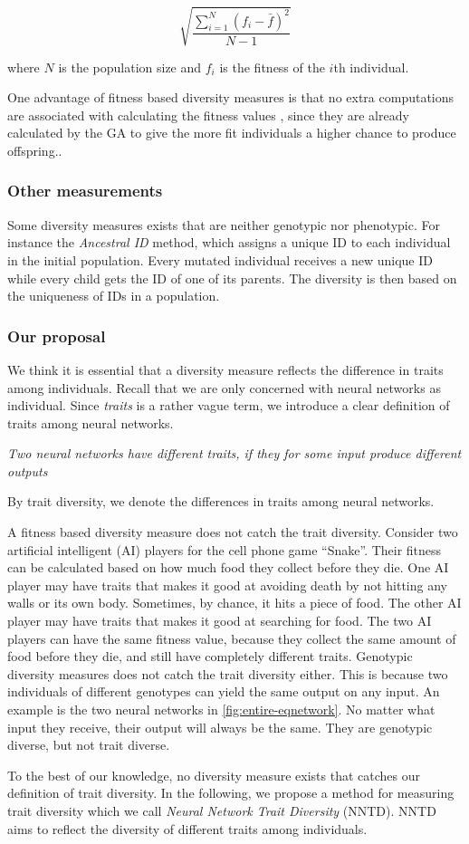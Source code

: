 \[\sqrt{\frac{\sum_{i=1}^N{(f_i-\bar{f})^2}}{N-1}}\]

where $N$ is the population size and $f_i$ is the fitness of the $i$th individual\cite{1250187}.

One advantage of fitness based diversity measures is that no extra computations are associated with calculating the fitness values , since they are already calculated by the GA to give the more fit individuals a higher chance to produce offspring.\cite{Nguyen:2006:ASPGP}.

\subsubsection{Other measurements}
Some diversity measures exists that are neither genotypic nor phenotypic. For instance the \emph{Ancestral ID}\cite{1250187} method, which assigns a unique ID to each individual in the initial population.
Every mutated individual receives a new unique ID while every child gets the ID of one of its parents.
The diversity is then based on the uniqueness of IDs in a population.

\subsubsection{Our proposal}
We think it is essential that a diversity measure reflects the difference in traits among individuals.
Recall that we are only concerned with neural networks as individual. 
Since \emph{traits} is a rather vague term, we introduce a clear definition of traits among neural networks.

\emph{Two neural networks have different traits, if they for some input produce different outputs}

By trait diversity, we denote the differences in traits among neural networks.

A fitness based diversity measure does not catch the trait diversity. Consider two artificial intelligent (AI) players for the cell phone game ``Snake''. Their fitness can be calculated based on how much food they collect before they die. One AI player may have traits that makes it good at avoiding death by not hitting any walls or its own body. Sometimes, by chance, it hits a piece of food. The other AI player may have traits that makes it good at searching for food. The two AI players can have the same fitness value, because they collect the same amount of food before they die, and still have completely different traits.
Genotypic diversity measures does not catch the trait diversity either. This is because two individuals of different genotypes can yield the same output on any input. An example is the two neural networks in \cref{fig:entire-eqnetwork}. No matter what input they receive, their output will always be the same. They are genotypic diverse, but not trait diverse.

%

%

To the best of our knowledge, no diversity measure exists that catches our definition of trait diversity.
In the following, we propose a method for measuring trait diversity which we call \emph{Neural Network Trait Diversity} (NNTD). 
NNTD aims to reflect the diversity of different traits among individuals. 